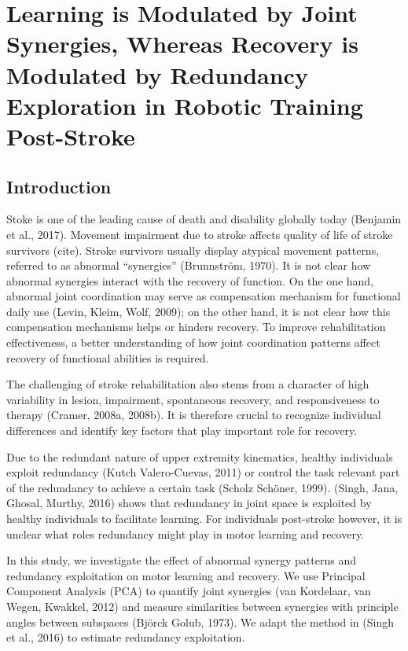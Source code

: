 \chapter{Learning is Modulated by Joint Synergies, Whereas Recovery is Modulated by Redundancy Exploration in Robotic Training Post-Stroke}
\label{cha:armeospring}



\section{Introduction}
Stoke is one of the leading cause of death and disability globally today (Benjamin et al., 2017).
Movement impairment due to stroke affects quality of life of stroke survivors (cite).
Stroke survivors usually display atypical movement patterns, referred to as abnormal “synergies” (Brunnström, 1970). 
It is not clear how abnormal synergies interact with the recovery of function. 
On the one hand, abnormal joint coordination may serve as compensation mechanism for functional daily use (Levin, Kleim,  Wolf, 2009); 
on the other hand, it is not clear how this compensation mechanisms helps or hinders recovery. 
To improve rehabilitation effectiveness, a better understanding of how joint coordination patterns affect recovery of functional abilities is required.
 
The challenging of stroke rehabilitation also stems from a character of high variability in lesion, impairment, spontaneous recovery, and responsiveness to therapy (Cramer, 2008a, 2008b). 
It is therefore crucial to recognize individual differences and identify key factors that play important role for recovery.
 
Due to the redundant nature of upper extremity kinematics, healthy individuals exploit redundancy (Kutch  Valero-Cuevas, 2011) or control the task relevant part of the redundancy to achieve a certain task (Scholz  Schöner, 1999). 
(Singh, Jana, Ghosal,  Murthy, 2016) shows that redundancy in joint space is exploited by healthy individuals to facilitate learning. 
For individuals post-stroke however, it is unclear what roles redundancy might play in motor learning and recovery.
 
In this study, we investigate the effect of abnormal synergy patterns and redundancy exploitation on motor learning and recovery. 
We use Principal Component Analysis (PCA) to quantify joint synergies (van Kordelaar, van Wegen,  Kwakkel, 2012) and measure similarities between synergies with principle angles between subspaces (Björck  Golub, 1973). 
We adapt the method in (Singh et al., 2016) to estimate redundancy exploitation.
 


